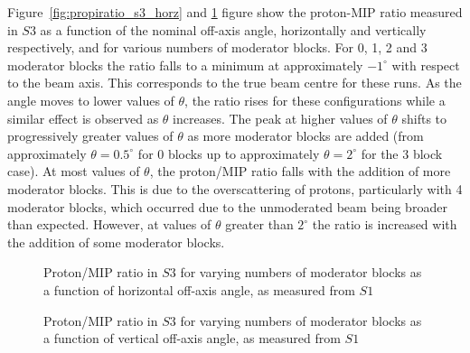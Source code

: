 Figure~\ref{fig:propiratio_s3_horz} and \ref{fig:propiratio_s3_vert} figure show the proton-MIP ratio measured in $\mathit{S3}$ as a function of the nominal off-axis angle, horizontally and vertically respectively, and for various numbers of moderator blocks.
For 0, 1, 2 and 3 moderator blocks the ratio falls to a minimum at approximately $-1^{\circ}$ with respect to the beam axis.
This corresponds to the true beam centre for these runs.
As the angle moves to lower values of $\theta$, the ratio rises for these configurations while a similar effect is observed as $\theta$ increases.
The peak at higher values of $\theta$ shifts to progressively greater values of $\theta$ as more moderator blocks are added (from approximately $\theta = 0.5^{\circ}$ for 0 blocks up to approximately $\theta = 2^{\circ}$ for the 3 block case).
At most values of $\theta$, the proton/MIP ratio falls with the addition of more moderator blocks. 
This is due to the overscattering of protons, particularly with 4 moderator blocks, which occurred due to the unmoderated beam being broader than expected.
However, at values of $\theta$ greater than $2^{\circ}$ the ratio is increased with the addition of some moderator blocks.

\begin{figure}[!ht]
  \begin{minipage}[t]{0.48\textwidth}
    \begin{adjustbox}{max totalsize={\textwidth}{.35\textheight}, center}
      
    \end{adjustbox}
    \caption{Proton/MIP ratio in $\mathit{S3}$ for varying numbers of moderator blocks as a function of horizontal off-axis angle, as measured from $\mathit{S1}$}
    \label{fig:propiratio_s3_horz}
  \end{minipage}
  \hspace{0.3cm}
  \begin{minipage}[t]{0.48\textwidth}
    \begin{adjustbox}{max totalsize={\textwidth}{.35\textheight}, center}
      
    \end{adjustbox}
    \caption{Proton/MIP ratio in $\mathit{S3}$ for varying numbers of moderator blocks as a function of vertical off-axis angle, as measured from $\mathit{S1}$}
    \label{fig:propiratio_s3_vert}
  \end{minipage}	
\end{figure}

